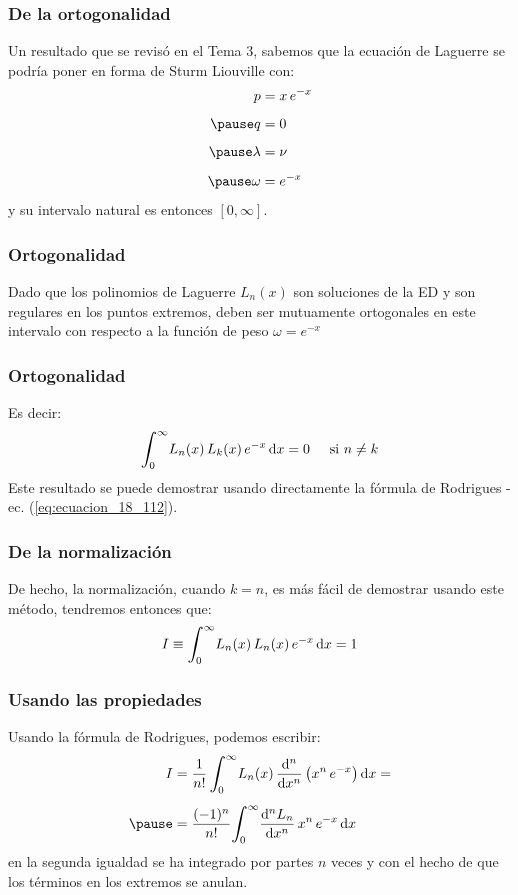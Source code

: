 \documentclass[12pt]{beamer}
\begin{document}
\begin{frame}
\frametitle{De la ortogonalidad}
Un resultado que se revisó en el Tema 3, sabemos que la ecuación de Laguerre se podría poner en forma de Sturm Liouville con:
\pause
\begin{eqnarray*}
\begin{aligned}
p &= x \, e^{-x} \\[0.5em] \pause
q &= 0 \\[0.5em] \pause
\lambda &= \nu \\[0.5em] \pause
\omega &= e^{-x}
\end{aligned}
\end{eqnarray*}
y su intervalo natural es entonces $[0, \infty]$.
\end{frame}
\begin{frame}
\frametitle{Ortogonalidad}
Dado que los polinomios de Laguerre $L_{n} (x)$ son soluciones de la ED \pause y son regulares en los puntos extremos, deben ser mutuamente ortogonales en este intervalo con respecto a la función de peso $\omega = e^{-x}$
\end{frame}
\begin{frame}
\frametitle{Ortogonalidad}
Es decir:
\pause
\begin{align*}
\scaleint{6ex}_{\bs 0}^{\infty} L_{n}(x) \, L_{k} (x) \, e^{-x} \dd{x} = 0 \hspace{0.5cm} \text{si } n \neq k
\end{align*}
Este resultado se puede demostrar usando directamente la fórmula de Rodrigues - ec. (\ref{eq:ecuacion_18_112}).
\end{frame}
\begin{frame}
\frametitle{De la normalización}
De hecho, la normalización, cuando $k = n$, es más fácil de demostrar usando este método, tendremos entonces que:
\pause
\begin{align}
I \equiv \scaleint{6ex}_{\bs 0}^{\infty} L_{n} (x) \, L_{n} (x) \, e^{-x} \dd{x} = 1
\label{eq:ecuacion_18_113}
\end{align}
\end{frame}
\begin{frame}
\frametitle{Usando las propiedades}
Usando la fórmula de Rodrigues, podemos escribir:
\pause
\begin{eqnarray*}
\begin{aligned}
I &= \dfrac{1}{n!} \, \scaleint{6ex}_{\bs 0}^{\infty} L_{n}(x) \, \dv[n]{x} \left( x^{n} \, e^{-x} \right) \dd{x} = \\[0.5em] \pause
&= \dfrac{(-1)^{n}}{n!} \scaleint{6ex}_{\bs 0}^{\infty} \dv[n]{L_{n}}{x} \, x^{n} \, e^{-x} \dd{x}
\end{aligned}
\end{eqnarray*}
\pause
en la segunda igualdad se ha integrado por partes $n$ veces y con el hecho de que los términos en los extremos se anulan.
\end{frame}
\end{document}
